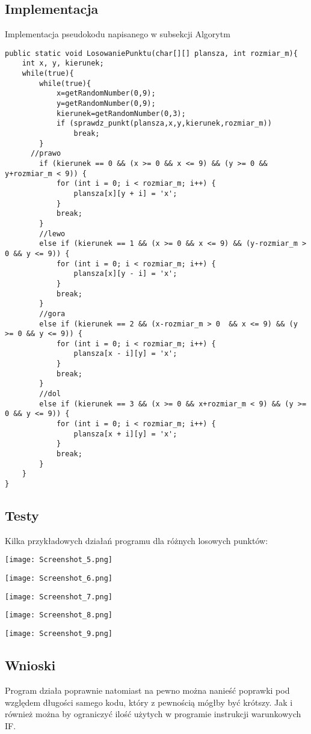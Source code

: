 \documentclass[12pt,a4paper]{article}
\begin{document}
	\subsection*{Implementacja}
	\newline\newline
	Implementacja pseudokodu napisanego w subsekcji Algorytm
	\begin{lstlisting}
public static void LosowaniePunktu(char[][] plansza, int rozmiar_m){
    int x, y, kierunek;
    while(true){
        while(true){
            x=getRandomNumber(0,9);
            y=getRandomNumber(0,9);
            kierunek=getRandomNumber(0,3);
            if (sprawdz_punkt(plansza,x,y,kierunek,rozmiar_m))
                break;          
        }
      //prawo
        if (kierunek == 0 && (x >= 0 && x <= 9) && (y >= 0 && y+rozmiar_m < 9)) {
            for (int i = 0; i < rozmiar_m; i++) {
                plansza[x][y + i] = 'x';
            }
            break;
        }
        //lewo
        else if (kierunek == 1 && (x >= 0 && x <= 9) && (y-rozmiar_m > 0 && y <= 9)) {
            for (int i = 0; i < rozmiar_m; i++) {
                plansza[x][y - i] = 'x';
            }
            break;
        }
        //gora
        else if (kierunek == 2 && (x-rozmiar_m > 0  && x <= 9) && (y >= 0 && y <= 9)) {
            for (int i = 0; i < rozmiar_m; i++) {
                plansza[x - i][y] = 'x';
            }
            break;
        }
        //dol
        else if (kierunek == 3 && (x >= 0 && x+rozmiar_m < 9) && (y >= 0 && y <= 9)) {
            for (int i = 0; i < rozmiar_m; i++) {
                plansza[x + i][y] = 'x';
            }
            break;
        }
    }
}
	\end{lstlisting}
	
	\subsection*{Testy}
	Kilka przykładowych działań programu dla różnych losowych punktów:
	\begin{center}
	    \texttt{[image: Screenshot\_5.png]}
	\end{center}
	\newline
	\begin{center}
	    \texttt{[image: Screenshot\_6.png]}
	\end{center}
	\begin{center}
	    \texttt{[image: Screenshot\_7.png]}
	\end{center}
	\begin{center}
	    \texttt{[image: Screenshot\_8.png]}
	\end{center}
	\begin{center}
	    \texttt{[image: Screenshot\_9.png]}
	\end{center}
	
	\subsection*{Wnioski}
	Program działa poprawnie natomiast na pewno można nanieść poprawki pod względem długości samego kodu, który z pewnością mógłby być krótszy. Jak i również można by ograniczyć ilość użytych w programie instrukcji warunkowych IF.
	
\end{document}
